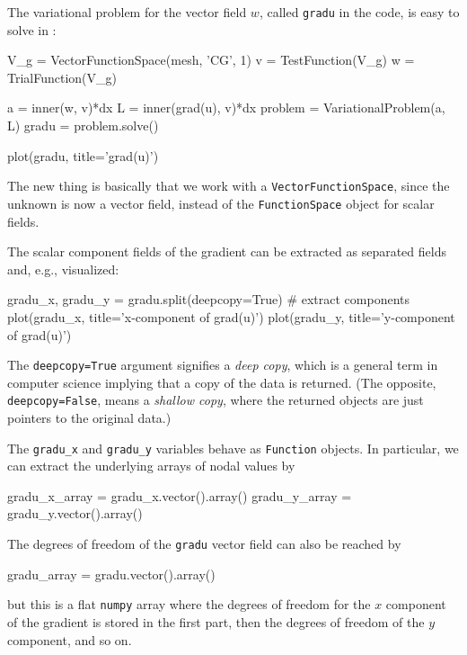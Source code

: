 The variational problem for the vector field
$w$, called {\fontsize{10pt}{10pt}\texttt{gradu}} in the code, is easy to solve in \fenics:
\begin{python}
V_g = VectorFunctionSpace(mesh, 'CG', 1)
v = TestFunction(V_g)
w = TrialFunction(V_g)

a = inner(w, v)*dx
L = inner(grad(u), v)*dx
problem = VariationalProblem(a, L)
gradu = problem.solve()

plot(gradu, title='grad(u)')
\end{python}
The new thing is basically that we work with a {\fontsize{10pt}{10pt}\texttt{VectorFunctionSpace}},
since the unknown is now a vector field, instead of the
{\fontsize{10pt}{10pt}\texttt{FunctionSpace}} object for scalar fields.

The scalar component fields of the gradient
can be extracted as separated fields and, e.g., visualized:
\begin{python}
gradu_x, gradu_y = gradu.split(deepcopy=True)  # extract components
plot(gradu_x, title='x-component of grad(u)')
plot(gradu_y, title='y-component of grad(u)')
\end{python}
The {\fontsize{10pt}{10pt}\texttt{deepcopy=True}} argument signifies a \emph{deep copy}, which is
a general term in computer science implying that a copy of the data is
returned. (The opposite, {\fontsize{10pt}{10pt}\texttt{deepcopy=False}}, 
means a \emph{shallow copy}, where
the returned objects are just pointers to the original data.)

The {\fontsize{10pt}{10pt}\verb!gradu_x!} and {\fontsize{10pt}{10pt}\verb!gradu_y!} variables behave as
{\fontsize{10pt}{10pt}\texttt{Function}} objects. In particular, we can extract the underlying
arrays of nodal values by
\begin{python}
gradu_x_array = gradu_x.vector().array()
gradu_y_array = gradu_y.vector().array()
\end{python}
The degrees of freedom of the {\fontsize{10pt}{10pt}\texttt{gradu}} vector field can also be
reached by
\begin{python}
gradu_array = gradu.vector().array()
\end{python}
but this is a flat {\fontsize{10pt}{10pt}\texttt{numpy}} array where the degrees of freedom
for the $x$ component of the gradient is stored in the first part, then the
degrees of freedom of the $y$ component, and so on.

